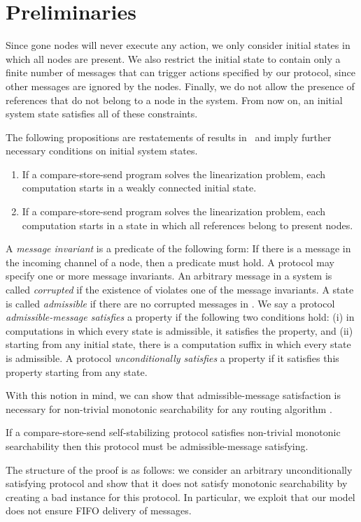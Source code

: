 \documentclass[a4paper,USenglish]{lipics}
\begin{document}
\section{Preliminaries}
\label{sec:preliminaries}

Since gone nodes will never execute any action, we only consider initial states in which all nodes are present. 
We also restrict the initial state to contain only a finite number of messages that can trigger actions specified by our protocol, since other messages are ignored by the nodes. 
Finally, we do not allow the presence of references that do not belong to a node in the system.
From now on, an initial system state satisfies all of these constraints.

The following propositions are restatements of results in~\cite{corona} and imply further necessary conditions on initial system states.
\begin{enumerate}
\item If a compare-store-send program solves the linearization problem, each computation starts in a weakly connected initial state.
\item If a compare-store-send program solves the linearization problem, each computation starts in a state in which all references belong to present nodes.
\end{enumerate}

A \emph{message invariant} is a predicate of the following form:
If there is a message  in the incoming channel of a node, then a predicate  must hold.
A protocol may specify one or more message invariants.
An arbitrary message  in a system is called \emph{corrupted} if the existence of  violates one of the message invariants.
A state  is called \emph{admissible} if there are no corrupted messages in .
We say a protocol \emph{admissible-message satisfies} a property if the following two conditions hold: (i) in computations in which every state is admissible, it satisfies the property, and (ii) starting from any initial state, there is a computation suffix in which every state is admissible.
A protocol \emph{unconditionally satisfies} a property if it satisfies this property starting from any state.

With this notion in mind, we can show that admissible-message satisfaction is necessary for non-trivial monotonic searchability for any routing algorithm .

\begin{lemma}\label{lem:admissible_message_necessary_for_monotonic_searchability}
If a compare-store-send self-stabilizing protocol satisfies non-trivial monotonic searchability then this protocol must be admissible-message satisfying.
\end{lemma}
The structure of the proof is as follows: we consider an arbitrary unconditionally satisfying protocol and show that it does not satisfy monotonic searchability by creating a bad instance for this protocol.
In particular, we exploit that our model does not ensure FIFO delivery of messages.
\end{document}
